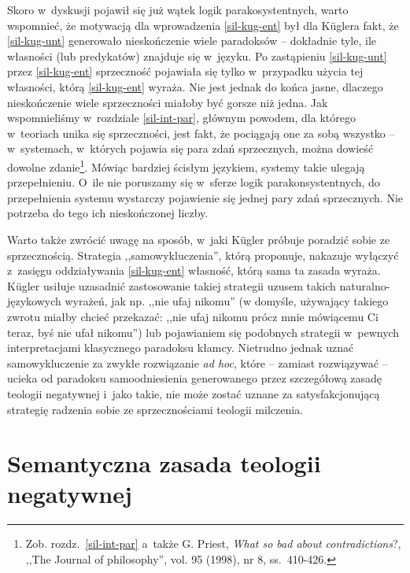 Skoro w~dyskusji pojawił się już wątek logik parakosystentnych, warto wspomnieć, że motywacją dla wprowadzenia \ref{sil-kug-ent} był dla Küglera fakt, że \ref{sil-kug-unt} generowało nieskończenie wiele paradoksów -- dokładnie tyle, ile własności (lub predykatów) znajduje się w~języku. Po zastąpieniu \ref{sil-kug-unt} przez \ref{sil-kug-ent} sprzeczność pojawiała się tylko w~przypadku użycia tej własności, którą \ref{sil-kug-ent} wyraża. Nie jest jednak do końca jasne, dlaczego nieskończenie wiele sprzeczności miałoby być gorsze niż jedna. Jak wspomnieliśmy w~rozdziale \ref{sil-int-par}, głównym powodem, dla którego w~teoriach unika się sprzeczności, jest fakt, że pociągają one za sobą wszystko -- w~systemach, w~których pojawia się para zdań sprzecznych, można dowieść dowolne zdanie\footnote{Zob. rozdz.~\ref{sil-int-par} a~także G. Priest, \textit{What so bad about contradictions}?, ,,The Journal of philosophy'', vol. 95 (1998), nr 8, ss.~410-426.}. Mówiąc bardziej ścisłym językiem, systemy takie ulegają przepełnieniu. O~ile nie poruszamy się w~sferze logik parakonsystentnych, do przepełnienia systemu wystarczy pojawienie się jednej pary zdań sprzecznych. Nie potrzeba do tego ich nieskończonej liczby.

Warto także zwrócić uwagę na sposób, w~jaki Kügler próbuje poradzić sobie ze sprzecznością. Strategia ,,samowykluczenia'', którą proponuje, nakazuje wyłączyć z~zasięgu oddziaływania \ref{sil-kug-ent} własność, którą sama ta zasada wyraża. Kügler usiłuje uzasadnić zastosowanie takiej strategii uzusem takich naturalno-językowych wyrażeń, jak np. ,,nie ufaj nikomu'' (w domyśle, używający takiego zwrotu miałby chcieć przekazać: ,,nie ufaj nikomu prócz mnie mówiącemu Ci teraz, byś nie ufał nikomu'') lub pojawianiem się podobnych strategii w~pewnych interpretacjami klasycznego paradoksu kłamcy. Nietrudno jednak uznać samowykluczenie za zwykłe rozwiązanie \textit{ad hoc}, które -- zamiast rozwiązywać -- ucieka od paradoksu samoodniesienia generowanego przez szczegółową zasadę teologii negatywnej i~jako takie, nie może zostać uznane za satysfakcjonującą strategię radzenia sobie ze sprzecznościami teologii milczenia.


\chapter{Semantyczna zasada teologii negatywnej}

